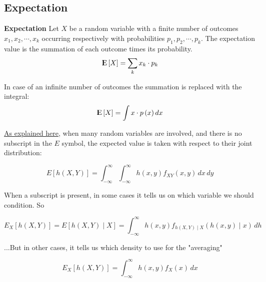 \subsection{Expectation}
\begin{definition}{\textbf{Expectation}}
Let $X$ be a random variable with a finite number of outcomes $x_1, x_2, \cdots, x_k$ occurring respectively with probabilities $p_1, p_2, \cdots, p_k$. The expectation value is the summation of each outcome times its probability.
\begin{equation}
{\rm I\kern-.3em E}\left[ X\right]= \sum_k x_k \cdot p_k
\end{equation}

In case of an infinite number of outcomes the summation is replaced with the integral:
\begin{equation}
{\rm I\kern-.3em E}\left[ X\right]= \int x \cdot p\left(x \right) dx
\end{equation}
\end{definition}

\href{https://stats.stackexchange.com/a/72614/238980}{As explained here}, when many random variables are involved, and there is no subscript in the $E$ symbol, the expected value is taken with respect to their joint distribution:

$$E[h(X,Y)] = \int_{-\infty}^\infty \int_{-\infty}^\infty h(x,y) f_{XY}(x,y) \, dx \, dy$$


When a subscript is present, in some cases it tells us on which variable we should condition. So

$$E_X[h(X,Y)] = E[h(X,Y)\mid X] = \int_{-\infty}^\infty h(x,y) f_{h(X,Y)\mid X}(h(x,y)\mid x)\,dh  $$

...But in other cases, it tells us which density to use for the "averaging"

$$E_X[h(X,Y)] = \int_{-\infty}^\infty h(x,y) f_{X}(x) \, dx $$



